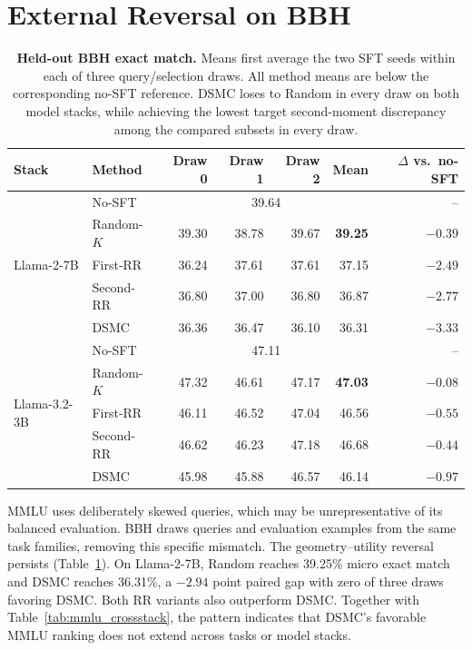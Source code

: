 \documentclass{article}
\newcommand{\method}{\textsc{DSMC}}
\begin{document}
\section{External Reversal on BBH}
\label{sec:bbh}

\begin{table}[t]
\caption{\textbf{Held-out BBH exact match.} Means first average the two SFT
seeds within each of three query/selection draws. All method means are below
the corresponding no-SFT reference. \method{} loses to Random in every draw on
both model stacks, while achieving the lowest target second-moment discrepancy
among the compared subsets in every draw.}
\label{tab:bbh}
\centering
\small
\begin{tabular}{llrrrrr}
\toprule
Stack & Method & Draw 0 & Draw 1 & Draw 2 & Mean & $\Delta$ vs.\ no-SFT \\
\midrule
\multirow{5}{*}{Llama-2-7B}
& No-SFT & \multicolumn{4}{c}{39.64} & -- \\
& Random-$K$ & 39.30 & 38.78 & 39.67 & \textbf{39.25} & $-0.39$ \\
& First-RR & 36.24 & 37.61 & 37.61 & 37.15 & $-2.49$ \\
& Second-RR & 36.80 & 37.00 & 36.80 & 36.87 & $-2.77$ \\
& \method{} & 36.36 & 36.47 & 36.10 & 36.31 & $-3.33$ \\
\midrule
\multirow{5}{*}{Llama-3.2-3B}
& No-SFT & \multicolumn{4}{c}{47.11} & -- \\
& Random-$K$ & 47.32 & 46.61 & 47.17 & \textbf{47.03} & $-0.08$ \\
& First-RR & 46.11 & 46.52 & 47.04 & 46.56 & $-0.55$ \\
& Second-RR & 46.62 & 46.23 & 47.18 & 46.68 & $-0.44$ \\
& \method{} & 45.98 & 45.88 & 46.57 & 46.14 & $-0.97$ \\
\bottomrule
\end{tabular}
\end{table}

MMLU uses deliberately skewed queries, which may be unrepresentative of its
balanced evaluation. BBH draws queries and evaluation examples from the same
task families, removing this specific mismatch. The geometry--utility reversal
persists (Table~\ref{tab:bbh}). On Llama-2-7B,
Random reaches 39.25\% micro exact match and \method{} reaches 36.31\%, a
$-2.94$ point paired gap with zero of three draws favoring \method{}. Both RR
variants also outperform \method{}. Together with
Table~\ref{tab:mmlu_crossstack}, the pattern indicates that \method{}'s favorable
MMLU ranking does not extend across tasks or model stacks.
\end{document}
